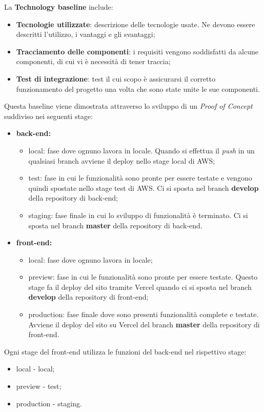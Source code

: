 La \textbf{Technology baseline} include:
\begin{itemize}
\item \textbf{Tecnologie utilizzate}: descrizione delle tecnologie usate. Ne devono essere descritti l'utilizzo, i vantaggi e gli svantaggi;
\item \textbf{Tracciamento delle componenti}: i requisiti vengono soddisfatti da alcune componenti, di cui vi è necessità di tener traccia;
\item \textbf{Test di integrazione}: test il cui scopo è assicurarsi il corretto funzionamento del progetto una volta che sono state unite le sue componenti.
\end{itemize}
Questa baseline viene dimostrata attraverso lo sviluppo di un \textit{Proof of Concept} suddiviso nei seguenti stage:
\begin{itemize}
\item \textbf{back-end:}
	\begin{itemize}
	\item local: fase dove ognuno lavora in locale. Quando si effettua il \textit{push} in un qualsiasi branch avviene il deploy nello stage local di AWS;
	\item test: fase in cui le funzionalità sono pronte per essere testate e vengono quindi spostate nello stage test di AWS. Ci si sposta nel branch \textbf{develop} della repository di back-end;
	\item staging: fase finale in cui lo sviluppo di funzionalità è terminato. Ci si sposta nel branch \textbf{master} della repository di back-end.
	\end{itemize}
\item \textbf{front-end:}
	\begin{itemize}
	\item local: fase dove ognuno lavora in locale;
	\item preview: fase in cui le funzionalità sono pronte per essere testate. Questo stage fa il deploy del sito tramite Vercel quando ci si sposta nel branch \textbf{develop} della repository di front-end;
	\item production: fase finale dove sono presenti funzionalità complete e testate. Avviene il deploy del sito su Vercel del branch \textbf{master} della repository di front-end.
	\end{itemize}
\end{itemize} 
Ogni stage del front-end utilizza le funzioni del back-end nel rispettivo stage:
\begin{itemize}
	\item local - local;
	\item preview - test;
	\item production - staging.
\end{itemize}

